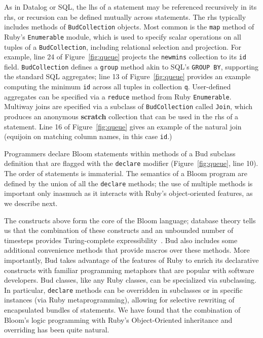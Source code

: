 As in Datalog or SQL, the lhs of a statement may be referenced recursively in its rhs, or recursion can be defined mutually across statements.  The rhs typically includes methods of \texttt{BudCollection} objects.  
Most common is the \texttt{map} method of Ruby's \texttt{Enumerable} module, which is used to specify scalar operations on all tuples of a \texttt{BudCollection}, including relational selection and projection. For example, line 24 of Figure~\ref{fig:queue} projects the \texttt{newmins} collection to its \texttt{id} field.  \texttt{BudCollection} defines a \texttt{group} method akin to SQL's \texttt{GROUP BY}, supporting the standard SQL aggregates; line 13 of Figure~\ref{fig:queue} provides an example computing the minimum \texttt{id} across all tuples in collection \texttt{q}.  User-defined aggregates can be specified via a \texttt{reduce} method from Ruby \texttt{Enumerable}.  Multiway joins are specified via a subclass of \texttt{BudCollection} called \texttt{Join}, which produces an anonymous \textbf{scratch} collection that can be used in the rhs of a statement. Line 16 of Figure~\ref{fig:queue} gives an example of the natural join (equijoin on matching column names, in this case \texttt{id}.)


Programmers declare Bloom statements within methods of a Bud subclass definition that are flagged with the \texttt{declare} modifier (Figure~\ref{fig:queue}, line 10).  The order of statements is immaterial.  The semantics of a Bloom program are defined by the union of all the \texttt{declare} methods; the use of multiple methods is important only inasmuch as it interacts with Ruby's object-oriented features, as we describe next.

The constructs above form the core of the Bloom language; database theory tells us that the combination of these constructs and an unbounded number of timesteps provides Turing-complete expressibility~\cite{Papadimitriou85}.  
Bud also includes some additional convenience methods that provide macros over these methods.  More importantly, Bud takes advantage of the features of Ruby to enrich its declarative constructs with familiar programming metaphors that are popular with software developers.  Bud classes, like any Ruby classes, can be specialized via subclassing.  In particular, \texttt{declare} methods can be overridden in subclasses or in specific instances (via Ruby metaprogramming), allowing for selective rewriting of encapsulated bundles of statements.  We have found that the combination of Bloom's logic programming with Ruby's Object-Oriented inheritance and overriding has been quite natural.

